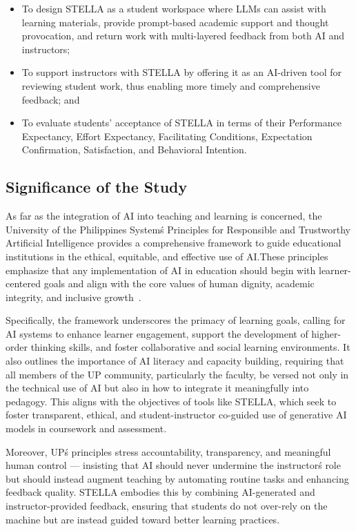 \documentclass[sigconf,natbib=true]{acmart}
\begin{document}
\begin{itemize}
  \item To design STELLA as a student workspace where LLMs can assist with learning materials, provide prompt-based academic support and thought provocation, and return work with multi-layered feedback from both AI and instructors;
  \item To support instructors with STELLA by offering it as an AI-driven tool for reviewing student work, thus enabling more timely and comprehensive feedback; and
  \item To evaluate students' acceptance of STELLA in terms of their Performance Expectancy, Effort Expectancy, Facilitating Conditions, Expectation Confirmation, Satisfaction, and Behavioral Intention.
\end{itemize}

\subsection{Significance of the Study}
As far as the integration of AI into teaching and learning is concerned, the University of the Philippines System\'s Principles for Responsible and Trustworthy Artificial Intelligence provides a comprehensive framework to guide educational institutions in the ethical, equitable, and effective use of AI.\@ These principles emphasize that any implementation of AI in education should begin with learner-centered goals and align with the core values of human dignity, academic integrity, and inclusive growth~\cite{universityofthephilippinesUniversityPhilippinesPrinciples2023a}.

Specifically, the framework underscores the primacy of learning goals, calling for AI systems to enhance learner engagement, support the development of higher-order thinking skills, and foster collaborative and social learning environments. It also outlines the importance of AI literacy and capacity building, requiring that all members of the UP community, particularly the faculty, be versed not only in the technical use of AI but also in how to integrate it meaningfully into pedagogy. This aligns with the objectives of tools like STELLA, which seek to foster transparent, ethical, and student-instructor co-guided use of generative AI models in coursework and assessment.

Moreover, UP\'s principles stress accountability, transparency, and meaningful human control — insisting that AI should never undermine the instructor\'s role but should instead augment teaching by automating routine tasks and enhancing feedback quality. STELLA embodies this by combining AI-generated and instructor-provided feedback, ensuring that students do not over-rely on the machine but are instead guided toward better learning practices.
\end{document}

